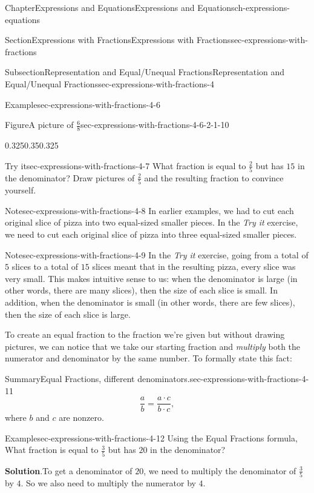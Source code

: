 \documentclass[twoside,11pt,]{book}
\newcommand{\blocktitlefont}{\relax}
\numberwithin{equation}{chapter}
\begin{document}
\begin{chapterptx}{Chapter}{Expressions and Equations}{}{Expressions and Equations}{}{}{ch-expressions-equations}
\begin{sectionptx}{Section}{Expressions with Fractions}{}{Expressions with Fractions}{}{}{sec-expressions-with-fractions}
\begin{subsectionptx}{Subsection}{Representation and Equal\slash{}Unequal Fractions}{}{Representation and Equal\slash{}Unequal Fractions}{}{}{sec-expressions-with-fractions-4}
\begin{example}{Example}{}{sec-expressions-with-fractions-4-6}
\begin{figureptx}{Figure}{A picture of \(\frac68\)}{sec-expressions-with-fractions-4-6-2-1-10}{}
\begin{image}{0.325}{0.35}{0.325}{}
{\begin{tikzpicture}
\end{tikzpicture}%
}%
\end{image}%
\tcblower
\end{figureptx}%
%
\end{example}
\begin{inlineexercise}{Try it}{}{sec-expressions-with-fractions-4-7}%
What fraction is equal to \(\frac25\) but has \(15\) in the denominator? Draw pictures of \(\frac25\) and the resulting fraction to convince yourself.%
\end{inlineexercise}%
\begin{note}{Note}{}{sec-expressions-with-fractions-4-8}%
In earlier examples, we had to cut each original slice of pizza into two equal-sized smaller pieces. In the \emph{Try it} exercise, we need to cut each original slice of pizza into three equal-sized smaller pieces.%
\end{note}
\begin{note}{Note}{}{sec-expressions-with-fractions-4-9}%
In the \emph{Try it} exercise, going from a total of \(5\) slices to a total of \(15\) slices meant that in the resulting pizza, every slice was very small. This makes intuitive sense to us: when the denominator is large (in other words, there are many slices), then the size of each slice is small. In addition, when the denominator is small (in other words, there are few slices), then the size of each slice is large.%
\end{note}
To create an equal fraction to the fraction we're given but without drawing pictures, we can notice that we take our starting fraction and \emph{multiply} both the numerator and denominator by the same number. To formally state this fact:%
\begin{assemblage}{Summary}{Equal Fractions, different denominators.}{sec-expressions-with-fractions-4-11}%
%
\begin{equation*}
\frac{a}{b}=\frac{a \cdot c}{b \cdot c},
\end{equation*}
where \(b\) and \(c\) are nonzero.%
\end{assemblage}
\begin{example}{Example}{}{sec-expressions-with-fractions-4-12}%
Using the Equal Fractions formula, What fraction is equal to \(\frac35\) but has \(20\) in the denominator?%
\par\smallskip%
\noindent\textbf{\blocktitlefont Solution}.\hypertarget{sec-expressions-with-fractions-4-12-2}{}\quad{}To get a denominator of \(20\), we need to multiply the denominator of \(\frac35\) by \(4\). So we also need to multiply the numerator by \(4\).%

\end{example}
\end{subsectionptx}
\end{sectionptx}
\end{chapterptx}
\end{document}
